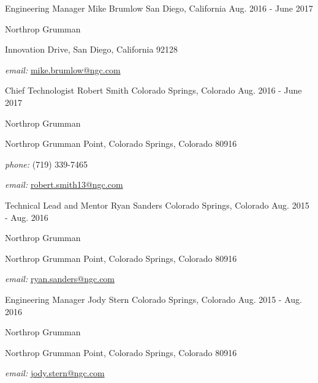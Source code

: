 \begin{cventries}
  \cventry
    {Engineering Manager}
    {Mike Brumlow}
    {San Diego, California}
    {Aug. 2016 - June 2017}
    {
        \begin{cvitems}
        \item[] \quad Northrop Grumman
        \item[]  Innovation Drive, San Diego, California 92128 
        \item[] \quad \textit{email:} \href{mailto:mike.brumlow@ngc.com}{mike.brumlow@ngc.com}
        \end{cvitems}
    }

  \cventry
    {Chief Technologist}
    {Robert Smith}
    {Colorado Springs, Colorado}
    {Aug. 2016 - June 2017}
    {
        \begin{cvitems}
        \item[] \quad Northrop Grumman
        \item[]  Northrop Grumman Point, Colorado Springs, Colorado 80916
        \item[] \quad \textit{phone:} (719) 339-7465
        \item[] \quad \textit{email:} \href{mailto:robert.smith13@ngc.com}{robert.smith13@ngc.com}
        \end{cvitems}
    }

  \cventry
    {Technical Lead and Mentor}
    {Ryan Sanders}
    {Colorado Springs, Colorado}
    {Aug. 2015 - Aug. 2016}
    {
        \begin{cvitems}
        \item[] \quad Northrop Grumman
        \item[]  Northrop Grumman Point, Colorado Springs, Colorado 80916
        \item[] \quad \textit{email:} \href{mailto:ryan.sanders@ngc.com}{ryan.sanders@ngc.com}
        \end{cvitems}
    }

  \cventry
    {Engineering Manager}
    {Jody Stern}
    {Colorado Springs, Colorado}
    {Aug. 2015 - Aug. 2016}
    {
        \begin{cvitems}
        \item[] \quad Northrop Grumman
        \item[]  Northrop Grumman Point, Colorado Springs, Colorado 80916
        \item[] \quad \textit{email:} \href{mailto:jody.stern@ngc.com}{jody.stern@ngc.com}
        \end{cvitems}
    }


\end{cventries}
